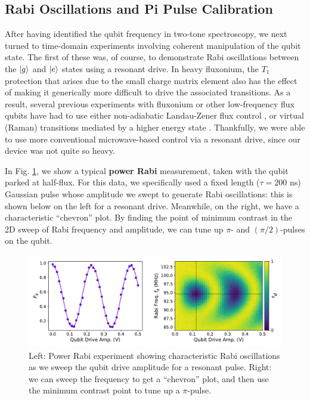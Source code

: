 \subsection{Rabi Oscillations and Pi Pulse Calibration}

After having identified the qubit frequency in two-tone spectroscopy, we next turned to time-domain experiments involving coherent manipulation of the qubit state. The first of these was, of course, to demonstrate Rabi oscillations between the $\lvert g\rangle$ and $\lvert e\rangle$ states using a resonant drive. In heavy fluxonium, the $T_1$ protection that arises due to the small charge matrix element also has the effect of making it generically more difficult to drive the associated transitions. As a result, several previous experiments with fluxonium or other low-frequency flux qubits have had to use either non-adiabatic Landau-Zener flux control \cite{oliver2005mach, campbell2020universal, zhang2021universal}, or virtual (Raman) transitions mediated by a higher energy state \cite{earnest2018realization}. Thankfully, we were able to use more conventional microwave-based control via a resonant drive, since our device was not quite so heavy. 

In Fig. \ref{fig:4_rabi}, we show a typical \textbf{power Rabi} measurement, taken with the qubit parked at half-flux. For this data, we specifically used a fixed length ($\tau = 200$ ns) Gaussian pulse whose amplitude we swept to generate Rabi oscillations: this is shown below on the left for a resonant drive. Meanwhile, on the right, we have a characteristic ``chevron'' plot. By finding the point of minimum contrast in the 2D sweep of Rabi frequency and amplitude, we can tune up $\pi$- and $(\pi/2)$-pulses on the qubit. 

\begin{figure}[h]
    \centering
    \includegraphics[width=0.95\linewidth]{Figures/4/rabi.pdf}
    \caption{Left: Power Rabi experiment showing characteristic Rabi oscillations as we sweep the qubit drive amplitude for a resonant pulse. Right: we can sweep the frequency to get a ``chevron'' plot, and then use the minimum contrast point to tune up a $\pi$-pulse.}
    \label{fig:4_rabi}
\end{figure}

